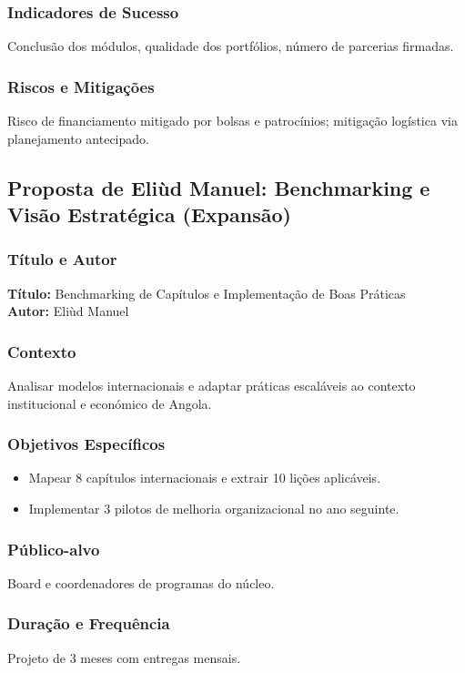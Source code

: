 \documentclass[12pt,a4paper]{article}
\begin{document}
\subsubsection*{Indicadores de Sucesso}
Conclusão dos módulos, qualidade dos portfólios, número de parcerias firmadas.

\subsubsection*{Riscos e Mitigações}
Risco de financiamento mitigado por bolsas e patrocínios; mitigação logística via planejamento antecipado.

\subsection{Proposta de Eliùd Manuel: Benchmarking e Visão Estratégica (Expansão)}

\subsubsection*{Título e Autor}
\textbf{Título:} Benchmarking de Capítulos e Implementação de Boas Práticas \\
\textbf{Autor:} Eliùd Manuel

\subsubsection*{Contexto}
Analisar modelos internacionais e adaptar práticas escaláveis ao contexto institucional e económico de Angola.

\subsubsection*{Objetivos Específicos}
\begin{itemize}
    \item Mapear 8 capítulos internacionais e extrair 10 lições aplicáveis.
    \item Implementar 3 pilotos de melhoria organizacional no ano seguinte.
\end{itemize}

\subsubsection*{Público-alvo}
Board e coordenadores de programas do núcleo.

\subsubsection*{Duração e Frequência}
Projeto de 3 meses com entregas mensais.
\end{document}
